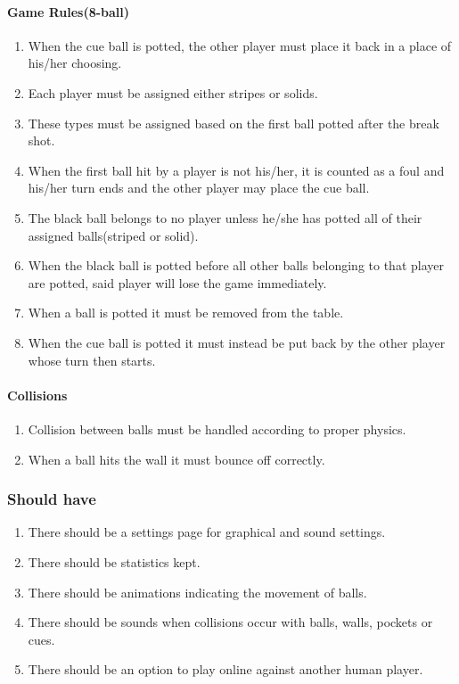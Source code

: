 \documentclass[10pt]{article}
\begin{document}
			\paragraph{Game Rules(8-ball)}
				\begin{enumerate}[resume]
					\item When the cue ball is potted, the other player must place it back in a place of his/her choosing.
					\item Each player must be assigned either stripes or solids.
					\item These types must be assigned based on the first ball potted after the break shot.
					\item When the first ball hit by a player is not his/her, it is counted as a foul and his/her turn ends and the other player may place the cue ball.\label{req:foulWrongBall}
					\item The black ball belongs to no player unless he/she has potted all of their assigned balls(striped or solid).\label{req:foulBlackBall}
					\item When the black ball is potted before all other balls belonging to that player are potted, said player will lose the game immediately.
					\item When a ball is potted it must be removed from the table.
					\item When the cue ball is potted it must instead be put back by the other player whose turn then starts.
				\end{enumerate}

			\paragraph{Collisions}
				\begin{enumerate}[resume]
					\item Collision between balls must be handled according to proper physics.\label{req:ballCollision}
					\item When a ball hits the wall it must bounce off correctly.
				\end{enumerate}

		\subsubsection{Should have}
			\begin{enumerate}[resume]
				\item There should be a settings page for graphical and sound settings.
				\item There should be statistics kept.
				\item There should be animations indicating the movement of balls.
				\item There should be sounds when collisions occur with balls, walls, pockets or cues.
				\item There should be an option to play online against another human player.
			\end{enumerate}
\end{document}

